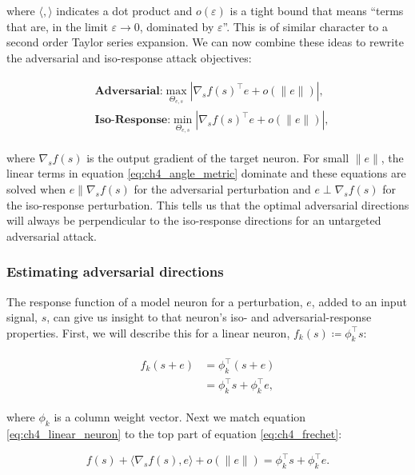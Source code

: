 where $\langle , \rangle$ indicates a dot product and $o(\varepsilon)$ is a tight bound that means ``terms that are, in the limit $\varepsilon \rightarrow 0$, dominated by $\varepsilon$''.
This is of similar character to a second order Taylor series expansion. We can now combine these ideas to rewrite the adversarial and iso-response attack objectives:

\begin{align}\label{eq:ch4_angle_metric}
\begin{split}
    &\textbf{Adversarial:} \max_{\Theta_{e,s}} |\nabla_{s}f(s)^\top e + o(\|e\|)|,\\
    &\textbf{Iso-Response:} \min_{\Theta_{e,s}} |\nabla_{s}f(s)^\top e + o(\|e\|)|,
\end{split}
\end{align}

where $\nabla_{s}f(s)$ is the output gradient of the target neuron.
For small $\|e\|$, the linear terms in equation \eqref{eq:ch4_angle_metric} dominate and these equations are solved when $e \parallel \nabla_{s}f(s)$ for the adversarial perturbation and $e \perp \nabla_{s}f(s)$ for the iso-response perturbation.
This tells us that the optimal adversarial directions will always be perpendicular to the iso-response directions for an untargeted adversarial attack. 

\subsubsection{Estimating adversarial directions}
The response function of a model neuron for a perturbation, $e$, added to an input signal, $s$, can give us insight to that neuron's iso- and adversarial-response properties. First, we will describe this for a linear neuron, $f_{k}(s) \coloneqq \phi_{k}^\top s$:

\begin{align}\label{eq:ch4_linear_neuron}
\begin{split}
    f_{k}(s+e) &= \phi_{k}^\top (s + e) \\
    &= \phi_{k}^\top s +\phi_{k}^\top e,
\end{split}
\end{align}

where $\phi_{k}$ is a column weight vector. Next we match equation \eqref{eq:ch4_linear_neuron} to the top part of equation \eqref{eq:ch4_frechet}:

\begin{equation}
    f(s) + \langle\nabla_{s}f(s), e\rangle + o(\|e\|) = \phi_{k}^\top s + \phi_{k}^\top e.
\end{equation}

